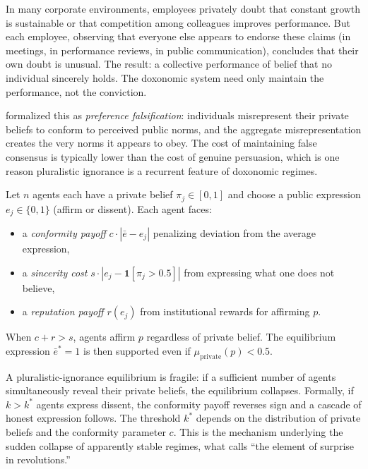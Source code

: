 \begin{example}
\label{ex:pluralistic-ignorance}
In many corporate environments, employees privately doubt that constant growth is sustainable or that competition among colleagues improves performance.
But each employee, observing that everyone else appears to endorse these claims (in meetings, in performance reviews, in public communication), concludes that their own doubt is unusual.
The result: a collective performance of belief that no individual sincerely holds.
The doxonomic system need only maintain the performance, not the conviction.
\end{example}

\textcite{kuran1995} formalized this as \emph{preference falsification}: individuals misrepresent their private beliefs to conform to perceived public norms, and the aggregate misrepresentation creates the very norms it appears to obey.
The cost of maintaining false consensus is typically lower than the cost of genuine persuasion, which is one reason pluralistic ignorance is a recurrent feature of doxonomic regimes.

\begin{model}
\label{mod:falsification}
Let $n$ agents each have a private belief $\pi_j \in [0,1]$ and choose a public expression $e_j \in \{0, 1\}$ (affirm or dissent).
Each agent faces:
\begin{itemize}[nosep]
  \item a \emph{conformity payoff} $c \cdot |\bar{e} - e_j|$ penalizing deviation from the average expression,
  \item a \emph{sincerity cost} $s \cdot |e_j - \mathbf{1}[\pi_j > 0.5]|$ from expressing what one does not believe,
  \item a \emph{reputation payoff} $r(e_j)$ from institutional rewards for affirming $p$.
\end{itemize}
When $c + r > s$, agents affirm $p$ regardless of private belief.
The equilibrium expression $\bar{e}^* = 1$ is then supported even if $\mu_{\text{private}}(p) < 0.5$.
\end{model}

\begin{proposition}
\label{prop:fragility}
A pluralistic-ignorance equilibrium is fragile: if a sufficient number of agents simultaneously reveal their private beliefs, the equilibrium collapses.
Formally, if $k > k^*$ agents express dissent, the conformity payoff reverses sign and a cascade of honest expression follows.
The threshold $k^*$ depends on the distribution of private beliefs and the conformity parameter $c$.
This is the mechanism underlying the sudden collapse of apparently stable regimes, what \textcite{kuran1995} calls ``the element of surprise in revolutions.''
\end{proposition}

